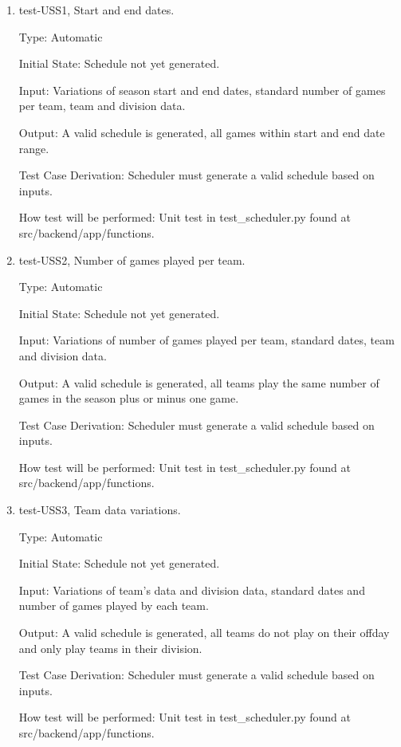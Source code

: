 \documentclass[12pt, titlepage]{article}
\begin{document}
\begin{enumerate}

\item{test-USS1, Start and end dates.\\}

Type: Automatic

Initial State: Schedule not yet generated.

Input: Variations of season start and end dates, standard number of games per
team, team and division data.

Output: A valid schedule is generated, all games within start and end date
range.

Test Case Derivation: Scheduler must generate a valid schedule based on
inputs.

How test will be performed: Unit test in test\_scheduler.py found at
src/backend/app/functions.

\item{test-USS2, Number of games played per team.\\}

Type: Automatic

Initial State: Schedule not yet generated.

Input: Variations of number of games played per team, standard dates, team and
division data.

Output: A valid schedule is generated, all teams play the same number of games
in the season plus or minus one game.

Test Case Derivation: Scheduler must generate a valid schedule based on
inputs.

How test will be performed: Unit test in test\_scheduler.py found at
src/backend/app/functions.

\item{test-USS3, Team data variations.\\}

Type: Automatic

Initial State: Schedule not yet generated.

Input: Variations of team's data and division data, standard dates and number
of games played by each team.

Output: A valid schedule is generated, all teams do not play on their offday
and only play teams in their division.

Test Case Derivation: Scheduler must generate a valid schedule based on
inputs.

How test will be performed: Unit test in test\_scheduler.py found at
src/backend/app/functions.

\end{enumerate}
\end{document}
